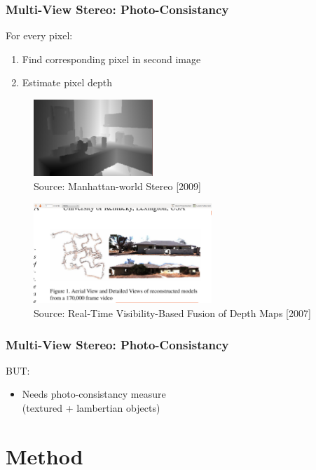 \documentclass{beamer}
\begin{document}
\begin{frame}
  \frametitle{Multi-View Stereo: Photo-Consistancy}
  For every pixel:
  \begin{enumerate}
    \item Find corresponding pixel in second image
    \item Estimate pixel depth
  \end{enumerate}

  \begin{figure}[htb!]
   \centering
   \includegraphics[width=0.4\textwidth]{img/depthmap_single}
   \caption*{\tiny Source: Manhattan-world Stereo [2009]}
  \end{figure}
  \begin{figure}[htb!]
   \centering
   \includegraphics[width=0.6\textwidth]{img/depthmap_merged}
   \caption*{\tiny Source: Real-Time Visibility-Based Fusion of Depth Maps [2007]}
  \end{figure}
\end{frame}

\begin{frame}
  \frametitle{Multi-View Stereo: Photo-Consistancy}
  BUT:
  \begin{itemize}
    \item Needs photo-consistancy measure \\
          (textured + lambertian objects)
  \end{itemize}
\end{frame}




\section{Method}
\end{document}
